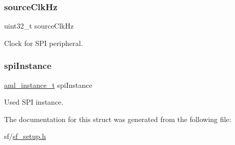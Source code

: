 \subsubsection{\texorpdfstring{sourceClkHz}{sourceClkHz}}
{\footnotesize\ttfamily uint32\+\_\+t source\+Clk\+Hz}

Clock for S\+PI peripheral. \mbox{\label{structsf__spi__config__t_abe234e3e56ed07590f4377320714a7d4}} 
\subsubsection{\texorpdfstring{spiInstance}{spiInstance}}
{\footnotesize\ttfamily \mbox{\hyperlink{common__aml_8h_a562bd37c7d07adcedec5993bc0cd96e5}{aml\+\_\+instance\+\_\+t}} spi\+Instance}

Used S\+PI instance. 

The documentation for this struct was generated from the following file\+:\begin{DoxyCompactItemize}
\item 
sf/\mbox{\hyperlink{sf__setup_8h}{sf\+\_\+setup.\+h}}\end{DoxyCompactItemize}
